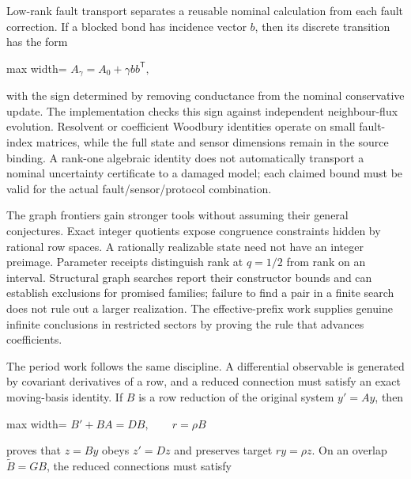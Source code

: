 \documentclass[
  11pt,
  a4paper,
]{report}
\begin{document}
Low-rank fault transport separates a reusable nominal calculation from
each fault correction. If a blocked bond has incidence vector \(b\),
then its discrete transition has the form

\begin{center}
\begin{adjustbox}{max width=\linewidth}
$\displaystyle
A_\gamma=A_0+\gamma bb^\mathsf T,
$
\end{adjustbox}
\end{center}

with the sign determined by removing conductance from the nominal
conservative update. The implementation checks this sign against
independent neighbour-flux evolution. Resolvent or coefficient Woodbury
identities operate on small fault-index matrices, while the full state
and sensor dimensions remain in the source binding. A rank-one algebraic
identity does not automatically transport a nominal uncertainty
certificate to a damaged model; each claimed bound must be valid for the
actual fault/sensor/protocol combination.

The graph frontiers gain stronger tools without assuming their general
conjectures. Exact integer quotients expose congruence constraints
hidden by rational row spaces. A rationally realizable state need not
have an integer preimage. Parameter receipts distinguish rank at
\(q=1/2\) from rank on an interval. Structural graph searches report
their constructor bounds and can establish exclusions for promised
families; failure to find a pair in a finite search does not rule out a
larger realization. The effective-prefix work supplies genuine infinite
conclusions in restricted sectors by proving the rule that advances
coefficients.

The period work follows the same discipline. A differential observable
is generated by covariant derivatives of a row, and a reduced connection
must satisfy an exact moving-basis identity. If \(B\) is a row reduction
of the original system \(y'=Ay\), then

\begin{center}
\begin{adjustbox}{max width=\linewidth}
$\displaystyle
B'+BA=DB,\qquad r=\rho B
$
\end{adjustbox}
\end{center}

proves that \(z=By\) obeys \(z'=Dz\) and preserves target \(ry=\rho z\).
On an overlap \(\widetilde B=GB\), the reduced connections must satisfy
\end{document}
